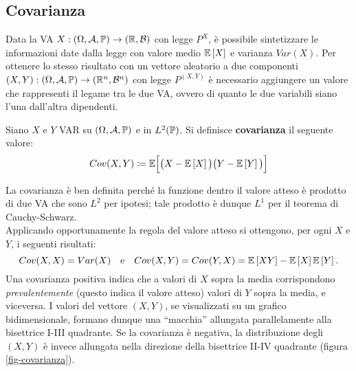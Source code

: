 \subsection{Covarianza}

Data la VA $X: \DoCo[1]$ con legge $P^X$, è possibile sintetizzare le informazioni date dalla legge con valore medio $\mathbb E \left[ X \right]$ e varianza $Var(X)$.
Per ottenere lo stesso risultato con un vettore aleatorio a due componenti $(X,Y): \DoCo$ con legge $P^{(X,Y)}$ è necessario aggiungere un valore che rappresenti il  legame tra le due VA, ovvero di quanto le due variabili siano l'una dall'altra dipendenti.

\begin{defn}
  Siano $X$ e $Y$ VAR su $(\Omega, \mathcal A, \mathbb P)$ e in $L^2(\mathbb P)$. Si definisce \textbf{covarianza} il seguente valore:
  $$ Cov(X,Y) \coloneqq \mathbb E \Big[ \big( X-\mathbb E \left[ X \right] \big) \big( Y-\mathbb E \left[ Y \right] \big) \Big] $$
\end{defn}

La covarianza è ben definita perché la funzione dentro il valore atteso è prodotto di due VA che sono $L^2$ per ipotesi; tale prodotto è dunque $L^1$ per il teorema di Cauchy-Schwarz. \\
Applicando opportunamente la regola del valore atteso si ottengono, per ogni $X$ e $Y$, i seguenti risultati:
$$Cov(X,X) = Var(X) \quad \text{e} \quad Cov(X,Y)=Cov(Y,X)=\mathbb E \left[ XY \right]-\mathbb E \left[ X \right]\mathbb E \left[ Y \right]. $$
Una covarianza positiva indica che a valori di $X$ sopra la media corrispondono \emph{prevalentemente} (questo indica il valore atteso) valori di $Y$ sopra la media, e viceversa. I valori del vettore $(X,Y)$, se visualizzati su un grafico bidimensionale, formano dunque una ``macchia'' allungata parallelamente alla bisettrice I-III quadrante. Se la covarianza è negativa, la distribuzione degli $(X,Y)$ è invece allungata nella direzione della bisettrice II-IV quadrante (figura \ref{fig-covarianza}).

